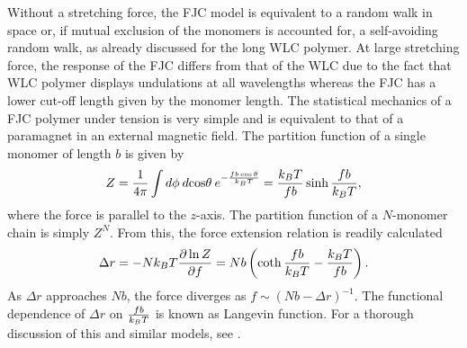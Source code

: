 Without a stretching force, the FJC model is equivalent to a random walk in space or, if mutual exclusion
of the monomers is accounted for, a self-avoiding random walk, as already discussed for the long
WLC polymer. At large stretching force, the response of the FJC differs from that of the 
WLC due to the fact that WLC polymer displays undulations at all wavelengths whereas the FJC
has a lower cut-off length given by the monomer length. The statistical mechanics
of a FJC polymer under tension is very simple and is equivalent to that of a paramagnet in an 
external magnetic field. The partition function of a single monomer of length $b$ is given by 
\begin{equation}
\label{eq:FJC_partfunc}
Z=\frac{1}{4\pi}\int d\phi \:d\!\cos\!\theta \:e^{-\frac{fb\cos\theta}{k_BT}}=\frac{k_BT}{fb}\sinh \frac{fb}{k_BT},
\end{equation}
where the force is parallel to the $z$-axis. The partition function of a $N$-monomer chain is simply $Z^{N}$. 
From this, the force extension relation is readily calculated
\begin{equation}
\label{eq:Langevin}
\Delta r=-Nk_BT\frac{\partial\ln Z}{\partial f}= Nb\left(\coth \frac{fb}{k_BT}-\frac{k_BT}{fb}\right).
\end{equation}
As $\Delta r$ approaches $Nb$, the force diverges as $f \sim (Nb - \Delta r)^{-1}$. The functional
dependence of $\Delta r$ on $\frac{fb}{k_BT}$ is known as Langevin function. For a thorough discussion 
of this and similar models, see \cite{Livadaru_Macromolecules_03}.

